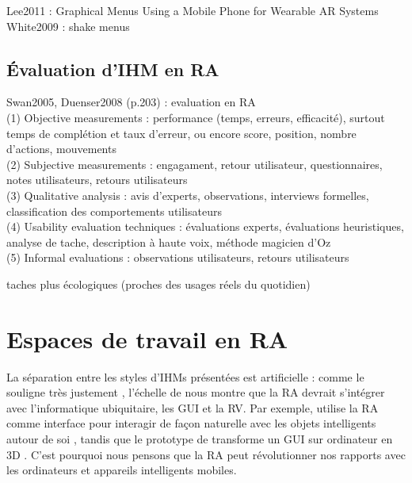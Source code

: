 Lee2011 : Graphical Menus Using a Mobile Phone for Wearable AR Systems\\
White2009 : shake menus

\subsection{Évaluation d'IHM en RA}
\label{subsec:litterature_ar_hci_evaluation}
Swan2005, Duenser2008 (p.203) : evaluation en RA\\
(1) Objective measurements : performance (temps, erreurs, efficacité), surtout temps de complétion et taux d'erreur, ou encore score, position, nombre d'actions, mouvements\\
(2) Subjective measurements : engagament, retour utilisateur, questionnaires, notes utilisateurs, retours utilisateurs\\
(3) Qualitative analysis : avis d'experts, observations, interviews formelles, classification des comportements utilisateurs\\
(4) Usability evaluation techniques : évaluations experts, évaluations heuristiques, analyse de tache, description à haute voix, méthode magicien d'Oz\\
(5) Informal evaluations : observations utilisateurs, retours utilisateurs

taches plus écologiques (proches des usages réels du quotidien)


\section{Espaces de travail en RA}
\label{sec:litterature_ar_worspaces}

La séparation entre les styles d'IHMs présentées \cite{Rekimoto1995}  est artificielle : comme le souligne très justement \cite{Billinghurst2015}, l'échelle de \cite{Milgram1994} nous montre que la RA devrait s'intégrer avec l'informatique ubiquitaire, les GUI et la RV. Par exemple, \cite{Heun2016} utilise la RA comme interface pour interagir de façon naturelle avec les objets intelligents autour de soi , tandis que le prototype  de \cite{Lee2013} transforme un GUI sur ordinateur en 3D . C'est pourquoi nous pensons que la RA peut révolutionner nos rapports avec les ordinateurs et appareils intelligents mobiles.


